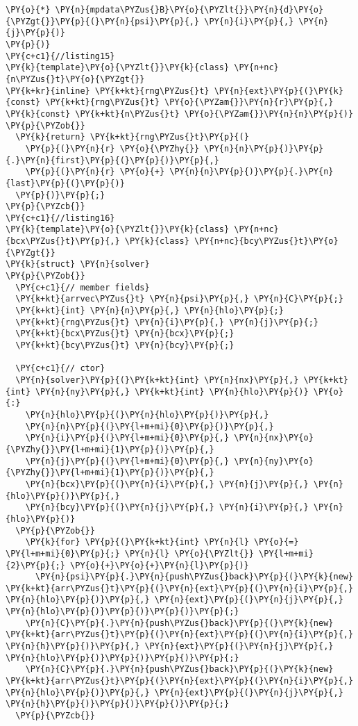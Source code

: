 \begin{Verbatim}[commandchars=\\\{\}]
  \PY{o}{*} \PY{n}{mpdata\PYZus{}B}\PY{o}{\PYZlt{}}\PY{n}{d}\PY{o}{\PYZgt{}}\PY{p}{(}\PY{n}{psi}\PY{p}{,} \PY{n}{i}\PY{p}{,} \PY{n}{j}\PY{p}{)}
\PY{p}{)} 
\PY{c+c1}{//listing15}
\PY{k}{template}\PY{o}{\PYZlt{}}\PY{k}{class} \PY{n+nc}{n\PYZus{}t}\PY{o}{\PYZgt{}}
\PY{k+kr}{inline} \PY{k+kt}{rng\PYZus{}t} \PY{n}{ext}\PY{p}{(}\PY{k}{const} \PY{k+kt}{rng\PYZus{}t} \PY{o}{\PYZam{}}\PY{n}{r}\PY{p}{,} \PY{k}{const} \PY{k+kt}{n\PYZus{}t} \PY{o}{\PYZam{}}\PY{n}{n}\PY{p}{)} \PY{p}{\PYZob{}} 
  \PY{k}{return} \PY{k+kt}{rng\PYZus{}t}\PY{p}{(}
    \PY{p}{(}\PY{n}{r} \PY{o}{\PYZhy{}} \PY{n}{n}\PY{p}{)}\PY{p}{.}\PY{n}{first}\PY{p}{(}\PY{p}{)}\PY{p}{,} 
    \PY{p}{(}\PY{n}{r} \PY{o}{+} \PY{n}{n}\PY{p}{)}\PY{p}{.}\PY{n}{last}\PY{p}{(}\PY{p}{)}
  \PY{p}{)}\PY{p}{;} 
\PY{p}{\PYZcb{}} 
\PY{c+c1}{//listing16}
\PY{k}{template}\PY{o}{\PYZlt{}}\PY{k}{class} \PY{n+nc}{bcx\PYZus{}t}\PY{p}{,} \PY{k}{class} \PY{n+nc}{bcy\PYZus{}t}\PY{o}{\PYZgt{}}
\PY{k}{struct} \PY{n}{solver}
\PY{p}{\PYZob{}}
  \PY{c+c1}{// member fields}
  \PY{k+kt}{arrvec\PYZus{}t} \PY{n}{psi}\PY{p}{,} \PY{n}{C}\PY{p}{;}
  \PY{k+kt}{int} \PY{n}{n}\PY{p}{,} \PY{n}{hlo}\PY{p}{;}
  \PY{k+kt}{rng\PYZus{}t} \PY{n}{i}\PY{p}{,} \PY{n}{j}\PY{p}{;}
  \PY{k+kt}{bcx\PYZus{}t} \PY{n}{bcx}\PY{p}{;}
  \PY{k+kt}{bcy\PYZus{}t} \PY{n}{bcy}\PY{p}{;}

  \PY{c+c1}{// ctor}
  \PY{n}{solver}\PY{p}{(}\PY{k+kt}{int} \PY{n}{nx}\PY{p}{,} \PY{k+kt}{int} \PY{n}{ny}\PY{p}{,} \PY{k+kt}{int} \PY{n}{hlo}\PY{p}{)} \PY{o}{:}
    \PY{n}{hlo}\PY{p}{(}\PY{n}{hlo}\PY{p}{)}\PY{p}{,}
    \PY{n}{n}\PY{p}{(}\PY{l+m+mi}{0}\PY{p}{)}\PY{p}{,} 
    \PY{n}{i}\PY{p}{(}\PY{l+m+mi}{0}\PY{p}{,} \PY{n}{nx}\PY{o}{\PYZhy{}}\PY{l+m+mi}{1}\PY{p}{)}\PY{p}{,} 
    \PY{n}{j}\PY{p}{(}\PY{l+m+mi}{0}\PY{p}{,} \PY{n}{ny}\PY{o}{\PYZhy{}}\PY{l+m+mi}{1}\PY{p}{)}\PY{p}{,}  
    \PY{n}{bcx}\PY{p}{(}\PY{n}{i}\PY{p}{,} \PY{n}{j}\PY{p}{,} \PY{n}{hlo}\PY{p}{)}\PY{p}{,} 
    \PY{n}{bcy}\PY{p}{(}\PY{n}{j}\PY{p}{,} \PY{n}{i}\PY{p}{,} \PY{n}{hlo}\PY{p}{)}
  \PY{p}{\PYZob{}}
    \PY{k}{for} \PY{p}{(}\PY{k+kt}{int} \PY{n}{l} \PY{o}{=} \PY{l+m+mi}{0}\PY{p}{;} \PY{n}{l} \PY{o}{\PYZlt{}} \PY{l+m+mi}{2}\PY{p}{;} \PY{o}{+}\PY{o}{+}\PY{n}{l}\PY{p}{)} 
      \PY{n}{psi}\PY{p}{.}\PY{n}{push\PYZus{}back}\PY{p}{(}\PY{k}{new} \PY{k+kt}{arr\PYZus{}t}\PY{p}{(}\PY{n}{ext}\PY{p}{(}\PY{n}{i}\PY{p}{,} \PY{n}{hlo}\PY{p}{)}\PY{p}{,} \PY{n}{ext}\PY{p}{(}\PY{n}{j}\PY{p}{,} \PY{n}{hlo}\PY{p}{)}\PY{p}{)}\PY{p}{)}\PY{p}{;}
    \PY{n}{C}\PY{p}{.}\PY{n}{push\PYZus{}back}\PY{p}{(}\PY{k}{new} \PY{k+kt}{arr\PYZus{}t}\PY{p}{(}\PY{n}{ext}\PY{p}{(}\PY{n}{i}\PY{p}{,} \PY{n}{h}\PY{p}{)}\PY{p}{,} \PY{n}{ext}\PY{p}{(}\PY{n}{j}\PY{p}{,} \PY{n}{hlo}\PY{p}{)}\PY{p}{)}\PY{p}{)}\PY{p}{;}
    \PY{n}{C}\PY{p}{.}\PY{n}{push\PYZus{}back}\PY{p}{(}\PY{k}{new} \PY{k+kt}{arr\PYZus{}t}\PY{p}{(}\PY{n}{ext}\PY{p}{(}\PY{n}{i}\PY{p}{,} \PY{n}{hlo}\PY{p}{)}\PY{p}{,} \PY{n}{ext}\PY{p}{(}\PY{n}{j}\PY{p}{,} \PY{n}{h}\PY{p}{)}\PY{p}{)}\PY{p}{)}\PY{p}{;}
  \PY{p}{\PYZcb{}}


\end{Verbatim}
